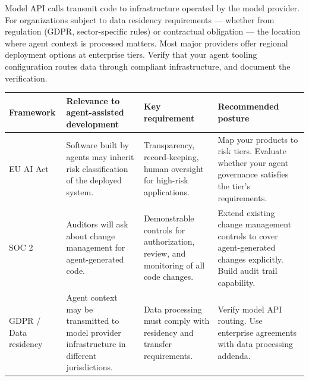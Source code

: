 \documentclass[
  a4paper,
  DIV=11,
  numbers=noendperiod]{scrreprt}
\newcounter{none} %
\begin{document}
Model API calls transmit code to infrastructure operated by the model
provider. For organizations subject to data residency requirements ---
whether from regulation (GDPR, sector-specific rules) or contractual
obligation --- the location where agent context is processed matters.
Most major providers offer regional deployment options at enterprise
tiers. Verify that your agent tooling configuration routes data through
compliant infrastructure, and document the verification.

{\def\LTcaptype{none} %
\begin{longtable}[]{@{}
  >{\raggedright\arraybackslash}p{}
  >{\raggedright\arraybackslash}p{}
  >{\raggedright\arraybackslash}p{}
  >{\raggedright\arraybackslash}p{}@{}}
\toprule\noalign{}
\begin{minipage}[b]{\linewidth}\raggedright
Framework
\end{minipage} & \begin{minipage}[b]{\linewidth}\raggedright
Relevance to agent-assisted development
\end{minipage} & \begin{minipage}[b]{\linewidth}\raggedright
Key requirement
\end{minipage} & \begin{minipage}[b]{\linewidth}\raggedright
Recommended posture
\end{minipage} \\
\midrule\noalign{}
\endhead
\bottomrule\noalign{}
\endlastfoot
EU AI Act & Software built by agents may inherit risk classification of
the deployed system. & Transparency, record-keeping, human oversight for
high-risk applications. & Map your products to risk tiers. Evaluate
whether your agent governance satisfies the tier's requirements. \\
SOC 2 & Auditors will ask about change management for agent-generated
code. & Demonstrable controls for authorization, review, and monitoring
of all code changes. & Extend existing change management controls to
cover agent-generated changes explicitly. Build audit trail
capability. \\
GDPR / Data residency & Agent context may be transmitted to model
provider infrastructure in different jurisdictions. & Data processing
must comply with residency and transfer requirements. & Verify model API
routing. Use enterprise agreements with data processing addenda.

\end{longtable}}
\end{document}
